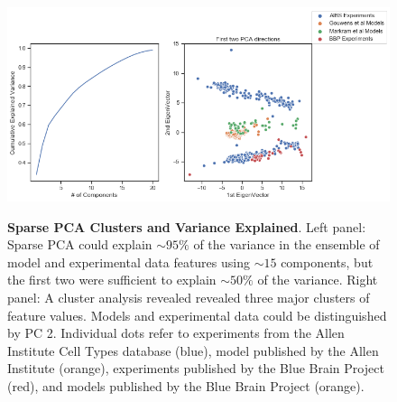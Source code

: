 \begin{figure}    
\begin{center} \includegraphics[width=1.0\linewidth]{figures/cortical_model_data_agreement_52_1}
\label{fig:}
\end{center}
\caption[Sparse PCA Clusters and Variance Explained]{\textbf{Sparse PCA Clusters and Variance Explained}.
Left panel: Sparse PCA could explain $\sim95\%$ of the variance in the ensemble of model and experimental data features using $\sim15$ components, but the first two were sufficient to explain $\sim50\%$ of the variance.
Right panel: A cluster analysis revealed revealed three major clusters of feature values.
Models and experimental data could be distinguished by PC 2.
Individual dots refer to experiments from the Allen Institute Cell Types database (blue), model published by the Allen Institute (orange), experiments published by the Blue Brain Project (red), and models published by the Blue Brain Project (orange).
}
\label{fig:pca_data_points}
\end{figure}    


